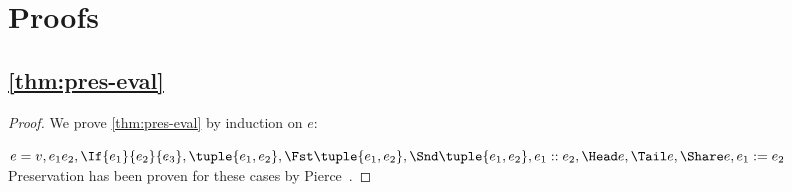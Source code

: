 
\section{Proofs}

\subsection{\cref{thm:pres-eval}}

\begin{proof}
  We prove \cref{thm:pres-eval} by induction on $e$:

  \case
    {$e=v,e_1 e_2,\If{e_1}{e_2}{e_3},\tuple{e_1, e_2},\Fst\tuple{e_1, e_2},\Snd\tuple{e_1, e_2}, e_1 :: e_2, \Head e, \Tail e,\Share e, e_1 := e_2$}
    {Preservation has been proven for these cases by Pierce~\cite{books/Pierce02TAPL}.}


\end{proof}
